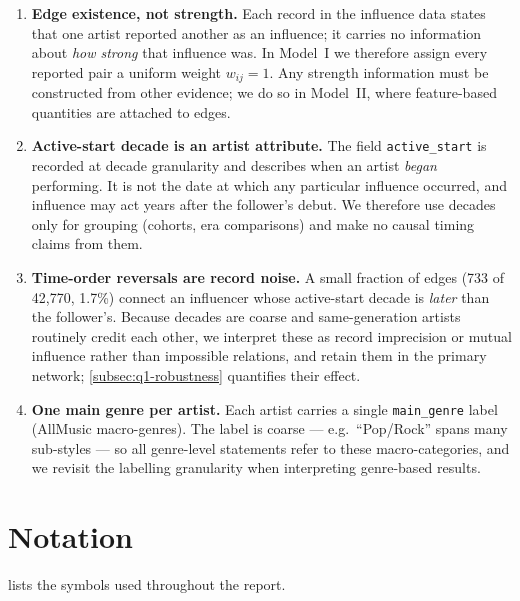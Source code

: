 \documentclass[11pt,letterpaper]{article}
\numberwithin{equation}{section}
\begin{document}
\begin{enumerate}[label=\textbf{A\arabic*.},leftmargin=2.2em]
  \item \label{assump:weight}
  \textbf{Edge existence, not strength.} Each record in the influence data
  states that one artist reported another as an influence; it carries no
  information about \emph{how strong} that influence was. In Model~I we
  therefore assign every reported pair a uniform weight \(w_{ij}=1\). Any
  strength information must be constructed from other evidence; we do so in
  Model~II, where feature-based quantities are attached to edges.
  \item \label{assump:decade}
  \textbf{Active-start decade is an artist attribute.} The field
  \texttt{active\_start} is recorded at decade granularity and describes when
  an artist \emph{began} performing. It is not the date at which any
  particular influence occurred, and influence may act years after the
  follower's debut. We therefore use decades only for grouping (cohorts,
  era comparisons) and make no causal timing claims from them.
  \item \label{assump:reverse}
  \textbf{Time-order reversals are record noise.} A small fraction of edges
  (733 of 42{,}770, 1.7\%) connect an influencer whose active-start decade is
  \emph{later} than the follower's. Because decades are coarse and
  same-generation artists routinely credit each other, we interpret these as
  record imprecision or mutual influence rather than impossible relations,
  and retain them in the primary network; \cref{subsec:q1-robustness}
  quantifies their effect.
  \item \label{assump:genre}
  \textbf{One main genre per artist.} Each artist carries a single
  \texttt{main\_genre} label (AllMusic macro-genres). The label is coarse ---
  e.g.\ ``Pop/Rock'' spans many sub-styles --- so all genre-level statements
  refer to these macro-categories, and we revisit the labelling granularity
  when interpreting genre-based results.
\end{enumerate}

\section{Notation}\label{sec:notation}

 lists the symbols used throughout the report.
\end{document}
